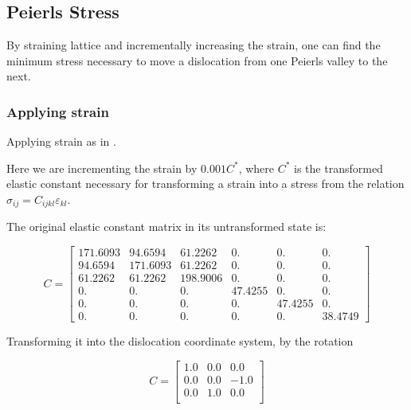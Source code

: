 \documentclass[11pt]{article}
\begin{document}
\subsection{Peierls Stress}
\label{sec:org27a4211}

By straining lattice and incrementally increasing the strain, one
can find the minimum stress necessary to move a dislocation from one
Peierls valley to the next. 

\subsubsection{Applying strain}
\label{sec:org517489b}

Applying strain as in \cite{Chen2013}. 

Here we are incrementing the strain by \(0.001C^{*}\), where \(C^{*}\) is
the transformed elastic constant necessary for transforming a
strain into a stress from the relation \(\sigma_{ij} = C_{ijkl}\varepsilon_{kl}\).

The original elastic constant matrix in its untransformed state
is:

\begin{equation*}
 C =	
  \begin{bmatrix}
   171.6093 &  94.6594 &  61.2262 &   0.     &   0.      &  0.      \\
    94.6594 & 171.6093 &  61.2262 &   0.     &   0.      &  0.      \\
    61.2262 &  61.2262 & 198.9006 &   0.     &   0.      &  0.      \\
     0.     &   0.     &   0.     &  47.4255 &   0.      &  0.      \\
     0.     &   0.     &   0.     &   0.     &  47.4255  &  0.      \\
     0.     &   0.     &   0.     &   0.     &   0.      & 38.4749  
  \end{bmatrix}
\end{equation*}

Transforming it into the dislocation coordinate system, by the
rotation

\begin{equation*}
 C =	
  \begin{bmatrix}
    1.0 & 0.0 & 0.0 \\
    0.0 & 0.0 & -1.0 \\
    0.0 & 1.0 & 0.0 \\
  \end{bmatrix}
\end{equation*}
\end{document}
